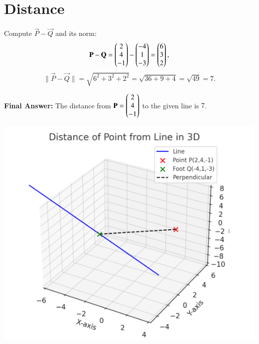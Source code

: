 \documentclass[journal]{IEEEtran}
\begin{document}
\section*{Distance}
Compute \(\vec{P}-\vec{Q}\) and its norm:
\begin{equation}
\mathbf{P}-\mathbf{Q}=\begin{pmatrix}2\\4\\-1\end{pmatrix}-\begin{pmatrix}-4\\1\\-3\end{pmatrix}=\begin{pmatrix}6\\3\\2\end{pmatrix},
\end{equation}
\begin{equation}
\|\vec{P}-\vec{Q}\|=\sqrt{6^2+3^2+2^2}=\sqrt{36+9+4}=\sqrt{49}=7.
\end{equation}

\bigskip
\noindent\textbf{Final Answer:} The distance from \(\mathbf{P}=\begin{pmatrix}2\\4\\-1\end{pmatrix}\) to the given line is \(\boxed{7}\).


\begin{center}
    \includegraphics[width=0.8\columnwidth]{figs/plot7.png}
\end{center}
\end{document}
